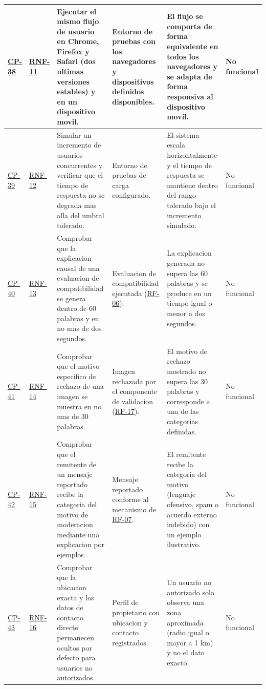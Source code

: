 \documentclass[journal,onecolumn]{IEEEtran}
\begin{document}
\begin{landscape}
\begin{longtable}{@{}p{1.3cm} p{1.3cm} p{4.6cm} p{3.6cm} p{5.2cm} p{1.6cm}@{}}
			\hyperref[cp:38]{CP-38}\label{cp:38} & \hyperref[tab:RNF-11]{RNF-11} & Ejecutar el mismo flujo de usuario en Chrome, Firefox y Safari (dos ultimas versiones estables) y en un dispositivo movil. & Entorno de pruebas con los navegadores y dispositivos definidos disponibles. & El flujo se comporta de forma equivalente en todos los navegadores y se adapta de forma responsiva al dispositivo movil. & No funcional \\ \midrule
			\hyperref[cp:39]{CP-39}\label{cp:39} & \hyperref[tab:RNF-12]{RNF-12} & Simular un incremento de usuarios concurrentes y verificar que el tiempo de respuesta no se degrada mas alla del umbral tolerado. & Entorno de pruebas de carga configurado. & El sistema escala horizontalmente y el tiempo de respuesta se mantiene dentro del rango tolerado bajo el incremento simulado. & No funcional \\ \midrule
			\hyperref[cp:40]{CP-40}\label{cp:40} & \hyperref[tab:RNF-13]{RNF-13} & Comprobar que la explicacion causal de una evaluacion de compatibilidad se genera dentro de 60 palabras y en no mas de dos segundos. & Evaluacion de compatibilidad ejecutada (\hyperref[tab:RF-06]{RF-06}). & La explicacion generada no supera las 60 palabras y se produce en un tiempo igual o menor a dos segundos. & No funcional \\ \midrule
			\hyperref[cp:41]{CP-41}\label{cp:41} & \hyperref[tab:RNF-14]{RNF-14} & Comprobar que el motivo especifico de rechazo de una imagen se muestra en no mas de 30 palabras. & Imagen rechazada por el componente de validacion (\hyperref[tab:RF-17]{RF-17}). & El motivo de rechazo mostrado no supera las 30 palabras y corresponde a una de las categorias definidas. & No funcional \\ \midrule
			\hyperref[cp:42]{CP-42}\label{cp:42} & \hyperref[tab:RNF-15]{RNF-15} & Comprobar que el remitente de un mensaje reportado recibe la categoria del motivo de moderacion mediante una explicacion por ejemplos. & Mensaje reportado conforme al mecanismo de \hyperref[tab:RF-07]{RF-07}. & El remitente recibe la categoria del motivo (lenguaje ofensivo, spam o acuerdo externo indebido) con un ejemplo ilustrativo. & No funcional \\ \midrule
			\hyperref[cp:43]{CP-43}\label{cp:43} & \hyperref[tab:RNF-16]{RNF-16} & Comprobar que la ubicacion exacta y los datos de contacto directo permanecen ocultos por defecto para usuarios no autorizados. & Perfil de propietario con ubicacion y contacto registrados. & Un usuario no autorizado solo observa una zona aproximada (radio igual o mayor a 1 km) y no el dato exacto. & No funcional \\ \midrule

\end{longtable}
\end{landscape}
\end{document}
